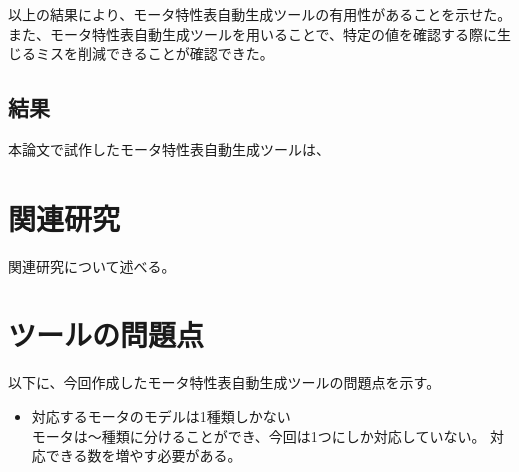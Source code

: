 以上の結果により、モータ特性表自動生成ツールの有用性があることを示せた。また、モータ特性表自動生成ツールを用いることで、特定の値を確認する際に生じるミスを削減できることが確認できた。


\subsection{結果}
本論文で試作したモータ特性表自動生成ツールは、

\section{関連研究}

	関連研究について述べる。

\section{ツールの問題点}

以下に、今回作成したモータ特性表自動生成ツールの問題点を示す。

\begin{itemize}
	\item 対応するモータのモデルは1種類しかない\\
		  モータは～種類に分けることができ、今回は1つにしか対応していない。
		  対応できる数を増やす必要がある。
		
\end{itemize}







